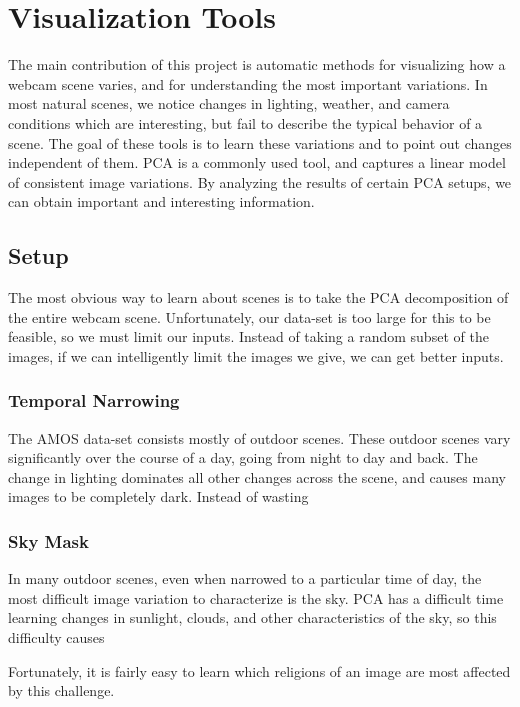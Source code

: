 \chapter{Visualization Tools}
\label{cpt:tools}

The main contribution of this project is automatic methods for visualizing how a webcam
scene varies, and for understanding the most important variations.  In most natural
scenes, we notice changes in lighting, weather, and camera conditions which are interesting,
but fail to describe the typical behavior of a scene.  The goal of these tools is to learn 
these variations and to point out changes independent of them.  PCA is a commonly used tool, and
captures a linear model of consistent image variations.  By analyzing the results of certain PCA setups, we can obtain important and interesting information.

\section{Setup}

The most obvious way to learn about scenes is to take the PCA decomposition of the entire webcam scene.  Unfortunately, our data-set is too large for this to be feasible, so we must limit our inputs.  Instead of taking a random subset of the images, if we can intelligently limit the images we give, we can get better inputs.

\subsection{Temporal Narrowing}

The AMOS data-set consists mostly of outdoor scenes.  These outdoor scenes vary significantly over the course of a day, going from night to day and back.  The change in lighting dominates all other changes across the scene, and causes many images to be completely dark.  Instead of wasting 

\subsection{Sky Mask}

In many outdoor scenes, even when narrowed to a particular time of day, the most difficult image
variation to characterize is the sky.  PCA has a difficult time learning changes in sunlight, clouds,
and other characteristics of the sky, so this difficulty causes

Fortunately, it is fairly easy to learn which religions of an image are most affected by this challenge.

